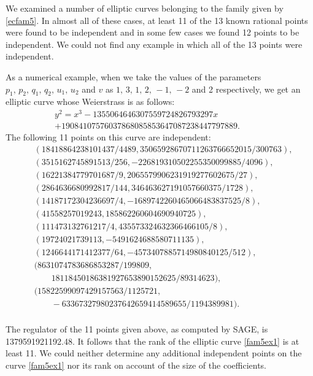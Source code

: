 \documentclass[11pt, leqno]{article}
\begin{document}
We examined a  number of elliptic curves belonging to the family given by \eqref{ecfam5}. In almost all of these cases,   at least 11 of the 13 known rational points were found to be independent and   in some few cases we found 12 points to be independent. We could not find any example in which all of the 13 points were independent. 

As a numerical example,  when we take the values of the parameters $p_1,\,p_2,\,q_1,\,q_2,\,u_1,\,u_2$ and $v$ as $1,\,3,\,1,\,2,\,-1,\,-2$ and 2 respectively, we get an elliptic curve whose Weierstrass  is as follows:
\begin{multline}
y^2 = x^3-1355064646307559724826793297x\\
+19084107576037868085853647087238447797889. \quad \quad \quad \label{fam5ex1}
\end{multline}
The following 11  points on this curve are independent:
\begin{align*}
&(18418864238101437/4489, 35065928670711263766652015/300763), \\
& (3515162745891513/256, -226819310502255350099885/4096), \\
&  (16221384779701687/9, 2065579906231919277602675/27), \\
& (2864636680992817/144, 346463627191057660375/1728), \\
&  (14187172304236697/4, -1689742260465066483837525/8), \\
& (41558257019243, 185862260604690940725), \\
& (111473132761217/4, 435573324632366466105/8), \\
& (19724021739113, -5491624688580711135), \\
& (1246644171412377/64, -4573407885714980840125/512),\\
& (8631074783686853287/199809, \\
& \quad \quad 18118450186381927653890152625/89314623), \\
& (15822599097429157563/1125721, \\
& \quad \quad -63367327980237642659414589655/1194389981). \\
\end{align*}

The regulator of the   11 points given above, as computed by SAGE, is  1379591921192.48. It follows that the rank of the elliptic curve \eqref{fam5ex1} is at least 11. 
We could neither  determine any additional independent points on the curve \eqref{fam5ex1} nor its rank on account of the size of the coefficients. 
\end{document}

